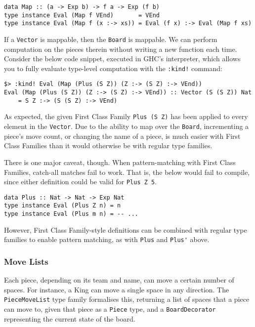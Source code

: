 \documentclass[12pt, a4paper, bibliography=totocnumbered]{scrartcl}
\begin{document}
\begin{lstlisting}
data Map :: (a -> Exp b) -> f a -> Exp (f b)
type instance Eval (Map f VEnd)       = VEnd
type instance Eval (Map f (x :-> xs)) = Eval (f x) :-> Eval (Map f xs)
\end{lstlisting}

If a \lstinline[basicstyle=\ttfamily]{Vector} is mappable, then the \lstinline[basicstyle=\ttfamily]{Board} is mappable. We can perform computation on the pieces therein without writing a new function each time. Consider the below code snippet, executed in GHC's interpreter, which allows you to fully evaluate type-level computation with the \lstinline[basicstyle=\ttfamily]{:kind!} command:

\begin{lstlisting}
$> :kind! Eval (Map (Plus (S Z)) (Z :-> (S Z) :-> VEnd))
Eval (Map (Plus (S Z)) (Z :-> (S Z) :-> VEnd)) :: Vector (S (S Z)) Nat
    = S Z :-> (S (S Z) :-> VEnd)
\end{lstlisting}

As expected, the given First Class Family \lstinline[basicstyle=\ttfamily]{Plus (S Z)} has been applied to every element in the \lstinline[basicstyle=\ttfamily]{Vector}. Due to the ability to map over the \lstinline[basicstyle=\ttfamily]{Board}, incrementing a piece's move count, or changing the name of a piece, is much easier with First Class Families than it would otherwise be with regular type families.

There is one major caveat, though. When pattern-matching with First Class Families, catch-all matches fail to work. That is, the below would fail to compile, since either definition could be valid for \lstinline[basicstyle=\ttfamily]{Plus Z 5}.

\begin{lstlisting}
data Plus :: Nat -> Nat -> Exp Nat
type instance Eval (Plus Z n) = n
type instance Eval (Plus m n) = -- ...
\end{lstlisting}

However, First Class Family-style definitions can be combined with regular type families to enable pattern matching, as with \lstinline[basicstyle=\ttfamily]{Plus} and \lstinline[basicstyle=\ttfamily]{Plus'} above.

\subsubsection{Move Lists}

Each piece, depending on its team and name, can move a certain number of spaces. For instance, a King can move a single space in any direction. The \lstinline[basicstyle=\ttfamily]{PieceMoveList} type family formalises this, returning a list of spaces that a piece can move to, given that piece as a \lstinline[basicstyle=\ttfamily]{Piece} type, and a \lstinline[basicstyle=\ttfamily]{BoardDecorator} representing the current state of the board.
\end{document}
